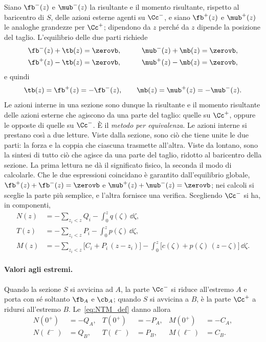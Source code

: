 Siano $\fb^-(z)$ e $\mub^-(z)$ la risultante e il
momento risultante, rispetto al baricentro di $S$, delle
azioni esterne agenti su $\Cc^-$, e siano $\fb^+(z)$ e
$\mub^+(z)$ le analoghe grandezze per $\Cc^+$; dipendono
da $z$ perché da $z$ dipende la posizione del taglio.
L'equilibrio delle due parti richiede
\begin{alignat*}{2}
	&\fb^-(z) + \tb(z) = \zerovb, &\qquad
	&\mub^-(z) + \mb(z) = \zerovb,\\
	&\fb^+(z) - \tb(z) = \zerovb, &\qquad
	&\mub^+(z) - \mb(z) = \zerovb,
\end{alignat*}
e quindi
\begin{equation}\label{eq:NTM_def}
	\tb(z) = \fb^+(z) = -\fb^-(z), \qquad
	\mb(z) = \mub^+(z) = -\mub^-(z).
\end{equation}
Le azioni interne in una sezione sono dunque la risultante
e il momento risultante delle azioni esterne che agiscono
da una parte del taglio: quelle su $\Cc^+$, oppure le
opposte di quelle su $\Cc^-$. È il \emph{metodo per
	equivalenza}.
Le azioni interne si prestano così a due letture. Viste
dalla sezione, sono ciò che tiene unite le due parti: la
forza e la coppia che ciascuna trasmette all'altra. Viste
da lontano, sono la sintesi di tutto ciò che agisce da
una parte del taglio, ridotto al baricentro della
sezione. La prima lettura ne dà il significato fisico,
la seconda il modo di calcolarle.
Che le due espressioni coincidano è garantito
dall'equilibrio globale, $\fb^+(z) + \fb^-(z) = \zerovb$
e $\mub^+(z) + \mub^-(z) = \zerovb$; nei calcoli si sceglie la
parte più semplice, e l'altra fornisce una verifica.
Scegliendo $\Cc^-$ si ha, in componenti,
\begin{equation}\label{eq:NTM_esplicite}
	\begin{aligned}
		N(z) &= -\sum_{z_i < z} Q_i - \int_0^z q(\zeta)\,\dd\zeta,\\
		T(z) &= -\sum_{z_i < z} P_i - \int_0^z p(\zeta)\,\dd\zeta,\\
		M(z) &= -\sum_{z_i < z} \bigl[C_i + P_i\,(z - z_i)\bigr]
		- \int_0^z \bigl[c(\zeta) + p(\zeta)\,(z - \zeta)\bigr]\,\dd\zeta.
	\end{aligned}
\end{equation}

\paragraph{Valori agli estremi.}
Quando la sezione $S$ si avvicina ad $A$, la parte
$\Cc^-$ si riduce all'estremo $A$ e porta con sé soltanto
$\fb_A$ e $\cb_A$; quando $S$ si avvicina a $B$, è la
parte $\Cc^+$ a ridursi all'estremo $B$. Le~\eqref{eq:NTM_def}
danno allora
\begin{align}
	N(0^+) &= -Q_A, & T(0^+) &= -P_A, & M(0^+) &= -C_A,
	\label{eq:cc_sinistra}\\
	N(\ell^-) &= Q_B, & T(\ell^-) &= P_B, & M(\ell^-) &= C_B.
	\label{eq:cc_destra}
\end{align}



